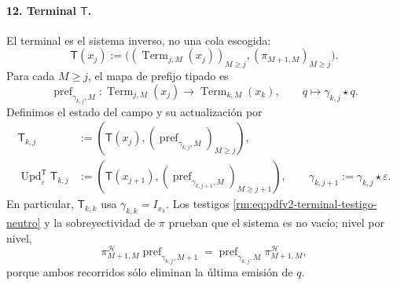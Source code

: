 \paragraph{12. Terminal \(\mathsf T\).}
El terminal es el sistema inverso, no una cola escogida:
\begin{equation}
\label{rm:eq:pdfv2-terminal-sistema-inverso-campo}
 \mathsf T(x_j):=
 \bigl((\operatorname{Term}_{j,M}(x_j))_{M\geq j},
       (\pi_{M+1,M})_{M\geq j}\bigr).
\end{equation}
Para cada \(M\geq j\), el mapa de prefijo tipado es
\begin{equation}
\label{rm:eq:pdfv2-terminal-update-t}
 \operatorname{pref}_{\gamma_{k,j},M}:
 \operatorname{Term}_{j,M}(x_j)\longrightarrow
 \operatorname{Term}_{k,M}(x_k),\qquad
 q\longmapsto\gamma_{k,j}\star q.
\end{equation}
Definimos el estado del campo y su actualización por
\begin{align}
 \mathsf T_{k,j}
 &:=
 \left(\mathsf T(x_j),
   (\operatorname{pref}_{\gamma_{k,j},M})_{M\geq j}\right),
 \label{rm:eq:pdfv2-terminal-estado-t}\\
 \operatorname{Upd}^{\mathsf T}_{\varepsilon}\mathsf T_{k,j}
 &:=
 \left(\mathsf T(x_{j+1}),
   (\operatorname{pref}_{\gamma_{k,j+1},M})_{M\geq j+1}\right),
 \qquad \gamma_{k,j+1}:=\gamma_{k,j}\star\varepsilon.
 \label{rm:eq:pdfv2-terminal-update-t-explicita}
\end{align}
En particular, \(\mathsf T_{k,k}\) usa
\(\gamma_{k,k}=I_{x_k}\). Los testigos
\eqref{rm:eq:pdfv2-terminal-testigo-neutro} y la sobreyectividad de \(\pi\)
prueban que el sistema es no vacío; nivel por nivel,
\begin{equation}
\label{rm:eq:pdfv2-terminal-prefijo-natural}
 \pi^{\mathscr H}_{M+1,M}
 \operatorname{pref}_{\gamma_{k,j},M+1}
 =\operatorname{pref}_{\gamma_{k,j},M}
  \pi^{\mathscr H}_{M+1,M},
\end{equation}
porque ambos recorridos sólo eliminan la última emisión de \(q\).

